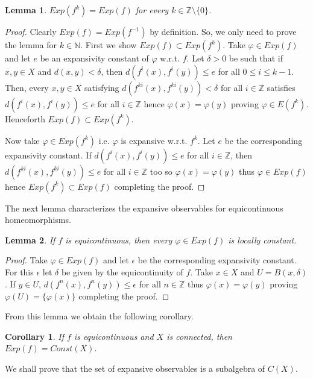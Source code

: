 \documentclass[11pt,letterpaper]{amsart}
\newtheorem{cor}{Corollary}
\newtheorem{lem}{Lemma}
\begin{document}
\begin{lem}
\label{mata}
$Exp(f^k)=Exp(f)$ for every $k\in\mathbb{Z}\setminus\{0\}$.
\end{lem}

\begin{proof}
Clearly $Exp(f)=Exp(f^{-1})$ by definition. So, we only need to prove the lemma
for $k\in\mathbb{N}$.
First we show $Exp(f)\subset Exp(f^k)$.
Take $\varphi\in Exp(f)$ and let $e$ be an expansivity constant of $\varphi$ w.r.t. $f$.  Let $\delta>0$ be such that
if $x,y\in X$ and $d(x,y)< \delta$, then $d(f^i(x),f^i(y))\leq e$ for all $0\leq i\leq k-1$.
Then, every $x,y\in X$ satisfying
$d(f^{ki}(x),f^{ki}(y))<\delta$ for all $i\in\mathbb{Z}$
satisfies $d(f^i(x),f^i(y))\leq e$ for all $i\in\mathbb{Z}$ hence
$\varphi(x)=\varphi(y)$ proving $\varphi\in E(f^k)$.
Henceforth $Exp(f)\subset Exp(f^k)$.

Now take $\varphi\in Exp(f^k)$
i.e. $\varphi$ is expansive w.r.t. $f^k$.
Let $e$ be the corresponding expansivity constant.
If $d(f^i(x),f^i(y))\leq e$ for all $i\in\mathbb{Z}$, then $d(f^{ki}(x),f^{ki}(y))\leq e$ for all $i\in\mathbb{Z}$ too so
$\varphi(x)=\varphi(y)$ thus $\varphi\in Exp(f)$ hence $Exp(f^k)\subset Exp(f)$ completing the proof.
\end{proof}




The next lemma characterizes the expansive observables for equicontinuous homeomorphisms.


\begin{lem}
\label{egon}
If $f$ is equicontinuous, then every $\varphi\in Exp(f)$ is locally constant.
\end{lem}

\begin{proof}
Take $\varphi\in Exp(f)$ and let $\epsilon$ be the corresponding expansivity constant.
For this $\epsilon$ let $\delta$ be given by the equicontinuity of $f$.
Take $x\in X$ and $U=B(x,\delta)$.
If $y\in U$, $d(f^n(x),f^n(y))\leq \epsilon$ for all $n\in\mathbb{Z}$ thus
$\varphi(x)=\varphi(y)$ proving $\varphi(U)=\{\varphi(x)\}$ completing the proof.
\end{proof}

From this lemma we obtain the following corollary.

\begin{cor}
\label{llevarlo}
If $f$ is equicontinuous and $X$ is connected, then $Exp(f)=Const(X)$.
\end{cor}


We shall prove that the set of expansive observables is a subalgebra of $C(X)$.
\end{document}
